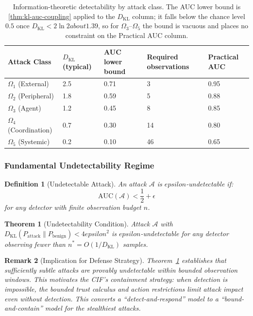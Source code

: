 \documentclass[
]{article}
\newtheorem{definition}{Definition}[section]
\newtheorem{theorem}{Theorem}[section]
\newtheorem{remark}[theorem]{Remark}
\begin{document}
\begin{table}[htbp]
\centering
\caption{Information-theoretic detectability by attack class. The AUC lower bound is \cref{thm:kl-auc-coupling} applied to the $D_{\mathrm{KL}}$ column; it falls below the chance level $0.5$ once $D_{\mathrm{KL}} < 2\ln 2 about 1.39$, so for $\Omega_3$--$\Omega_5$ the bound is vacuous and places no constraint on the Practical AUC column.}
\label{tab:it-detectability}
\begin{tabular}{@{}lllll@{}}
\toprule
Attack Class & $D_{\mathrm{KL}}$ (typical) & AUC lower bound & Required observations & Practical AUC \\
\midrule
$\Omega_1$ (External) & 2.5 & 0.71 & 3 & 0.95 \\
$\Omega_2$ (Peripheral) & 1.8 & 0.59 & 5 & 0.88 \\
$\Omega_3$ (Agent) & 1.2 & 0.45 & 8 & 0.85 \\
$\Omega_4$ (Coordination) & 0.7 & 0.30 & 14 & 0.80 \\
$\Omega_5$ (Systemic) & 0.2 & 0.10 & 46 & 0.65 \\
\bottomrule
\end{tabular}
\end{table}

\subsubsection{Fundamental Undetectability
Regime}\label{fundamental-undetectability-regime}

\begin{definition}[Undetectable Attack]
\label{def:undetectable}
An attack $\mathcal{A}$ is $epsilon$-undetectable if:
\begin{equation}
\label{eq:undetectable}
\text{AUC}(\mathcal{A}) < \frac{1}{2} + \epsilon
\end{equation}
for any detector with finite observation budget $n$.
\end{definition}

\begin{theorem}[Undetectability Condition]
\label{thm:undetectability}
Attack $\mathcal{A}$ with $D_{\mathrm{KL}}(P_{\text{attack}} \| P_{\text{benign}}) < 4epsilon^2$ is $epsilon$-undetectable for any detector observing fewer than $n^* = O(1/D_{\mathrm{KL}})$ samples.
\end{theorem}

\begin{remark}[Implication for Defense Strategy]
\label{rem:undetectability-implication}
Theorem~\ref{thm:undetectability} establishes that sufficiently subtle attacks are provably undetectable within bounded observation windows. This motivates the CIF's containment strategy: when detection is impossible, the bounded trust calculus and action restrictions limit attack impact even without detection. This converts a ``detect-and-respond'' model to a ``bound-and-contain'' model for the stealthiest attacks.
\end{remark}
\end{document}
